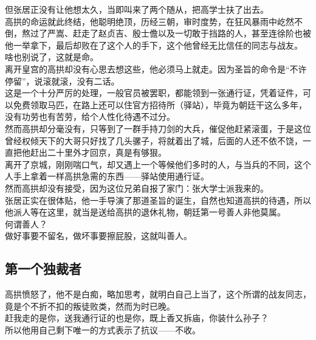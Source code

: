 \begin{multicols}{\theparacolNo}
但张居正没有让他想太久，当即叫来了两个随从，把高学士扶了出去。\\

高拱的命运就此终结，他聪明绝顶，历经三朝，审时度势，在狂风暴雨中屹然不倒，熬过了严嵩、赶走了赵贞吉、殷士儋以及一切敢于挡路的人，甚至连徐阶也被他一举拿下，最后却败在了这个人的手下，这个他曾经无比信任的同志与战友。\\

啥也别说了，这就是命。\\

离开皇宫的高拱却没有心思去想这些，他必须马上就走。因为圣旨的命令是“不许停留”，说滚就滚，没有二话。\\

这是一个十分严厉的处理，一般官员被罢职，都能领到一张通行证，凭着证件，可以免费领取马匹，在路上还可以住官方招待所（驿站），毕竟为朝廷干这么多年，没有功劳也有苦劳，给个人性化待遇不过分。\\

然而高拱却分毫没有，只等到了一群手持刀剑的大兵，催促他赶紧滚蛋，于是这位曾经权倾天下的大哥只好找了几头骡子，将就着出了城，后面的人还不依不饶，一直把他赶出二十里外才回京，真是有够狠。\\

离开了京城，刚刚喘口气，却又遇上一个等候他们多时的人，与当兵的不同，这个人手上拿着一样高拱急需的东西——驿站使用通行证。\\

然而高拱却没有接受，因为这位兄弟自报了家门：张大学士派我来的。\\

张居正实在很体贴，他一手导演了那道圣旨的诞生，自然也知道高拱的待遇，所以他派人等在这里，就当是送给高拱的退休礼物，朝廷第一号善人非他莫属。\\

何谓善人？\\

做好事要不留名，做坏事要擦屁股，这就叫善人。\\

\subsection{第一个独裁者}
高拱愤怒了，他不是白痴，略加思考，就明白自己上当了，这个所谓的战友同志，竟是个不折不扣的叛徒败类，然而为时已晚。\\

赶我走的是你，送我通行证的也是你，既上香又拆庙，你装什么孙子？\\

所以他用自己剩下唯一的方式表示了抗议——不收。\\


\end{multicols}
